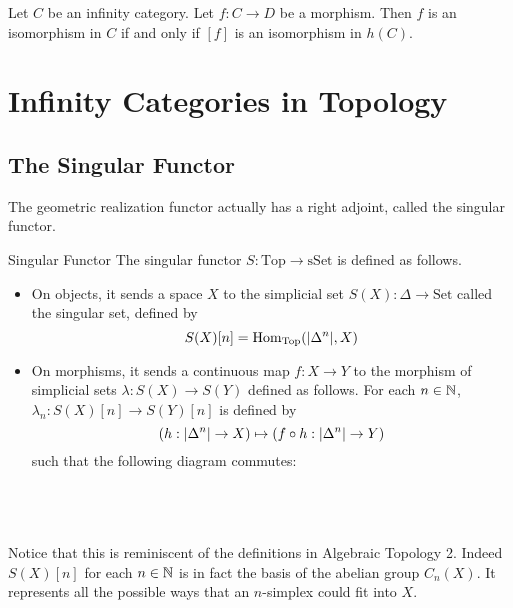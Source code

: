 \documentclass[a4paper]{article}
\begin{document}
\begin{lmm}{}{} Let $C$ be an infinity category. Let $f:C\to D$ be a morphism. Then $f$ is an isomorphism in $C$ if and only if $[f]$ is an isomorphism in $h(C)$. 
\end{lmm}

\pagebreak
\section{Infinity Categories in Topology}
\subsection{The Singular Functor}
The geometric realization functor actually has a right adjoint, called the singular functor. 

\begin{defn}{Singular Functor}{} The singular functor $S:\text{Top}\to\text{sSet}$ is defined as follows. 
\begin{itemize}
\item On objects, it sends a space $X$ to the simplicial set $S(X):\Delta\to\text{Set}$ called the singular set, defined by $$S(X)[n]=\operatorname{Hom}_{\text{Top}}(\abs{\Delta^n},X)$$
\item On morphisms, it sends a continuous map $f:X\to Y$ to the morphism of simplicial sets $\lambda:S(X)\to S(Y)$ defined as follows. For each $n\in\mathbb{N}$, $\lambda_n:S(X)[n]\to S(Y)[n]$ is defined by $$\left(h:\abs{\Delta^n}\to X\right)\mapsto\left(f\circ h:\abs{\Delta^n}\to Y\right)$$ such that the following diagram commutes: \\~\\
\\~\\
\end{itemize}
\end{defn}

Notice that this is reminiscent of the definitions in Algebraic Topology 2. Indeed $S(X)[n]$  for each $n\in\mathbb{N}$ is in fact the basis of the abelian group $C_n(X)$. It represents all the possible ways that an $n$-simplex could fit into $X$. 
\end{document}
